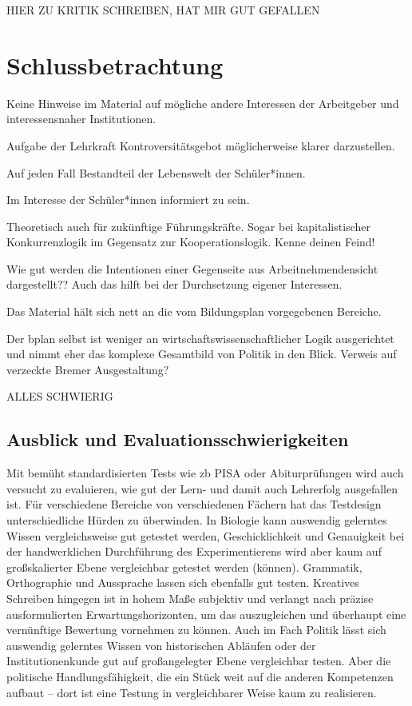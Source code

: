 HIER ZU  KRITIK SCHREIBEN, HAT MIR GUT GEFALLEN
\autocite[]{Roler2016}

\section{Schlussbetrachtung}
Keine Hinweise im Material auf mögliche andere Interessen der Arbeitgeber und interessensnaher Institutionen.

Aufgabe der Lehrkraft Kontroversitätsgebot möglicherweise klarer darzustellen.

Auf jeden Fall Bestandteil der Lebenswelt der Schüler*innen.

Im Interesse der Schüler*innen informiert zu sein.

Theoretisch auch für zukünftige Führungskräfte. Sogar bei kapitalistischer Konkurrenzlogik im Gegensatz zur Kooperationslogik. Kenne deinen Feind!

Wie gut werden die Intentionen einer Gegenseite aus Arbeitnehmendensicht dargestellt??
Auch das hilft bei der Durchsetzung eigener Interessen.

Das Material hält sich nett an die vom Bildungsplan vorgegebenen Bereiche. 

Der bplan selbst ist weniger an wirtschaftswissenschaftlicher Logik ausgerichtet und nimmt eher das komplexe Gesamtbild von Politik in den Blick.
Verweis auf verzeckte Bremer Ausgestaltung?

ALLES SCHWIERIG

\subsection{Ausblick und Evaluationsschwierigkeiten}
Mit bemüht standardisierten Tests wie \gls{zb} PISA oder Abiturprüfungen wird auch versucht zu evaluieren, wie gut der Lern- und damit auch Lehrerfolg ausgefallen ist. Für verschiedene Bereiche von verschiedenen Fächern hat das Testdesign unterschiedliche Hürden zu überwinden. 
In Biologie kann auswendig gelerntes Wissen vergleichsweise gut getestet werden, Geschicklichkeit und Genauigkeit bei der handwerklichen Durchführung des Experimentierens wird aber kaum auf großskalierter Ebene vergleichbar getestet werden (können).
Grammatik, Orthographie und Aussprache lassen sich ebenfalls gut testen. Kreatives Schreiben hingegen ist in hohem Maße subjektiv und verlangt nach präzise ausformulierten Erwartungshorizonten, um das auszugleichen und überhaupt eine vernünftige Bewertung vornehmen zu können. 
Auch im Fach Politik lässt sich auswendig gelerntes Wissen von historischen Abläufen oder der Institutionenkunde gut auf großangelegter Ebene vergleichbar testen. Aber die politische Handlungsfähigkeit, die ein Stück weit auf die anderen Kompetenzen aufbaut -- dort ist eine Testung in vergleichbarer Weise kaum zu realisieren. 

